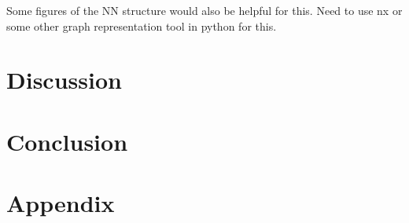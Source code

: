 \documentclass[honours,12pt]{unswthesis}
\numberwithin{equation}{section}
\begin{document}
Some figures of the NN structure would also be helpful for this.
Need to use nx or some other graph representation tool in python for this.

\chapter{Discussion}\label{dis}

\chapter{Conclusion}\label{ccl}

\chapter{Appendix}\label{app}



\clearpage
{}
{}

\end{document}
